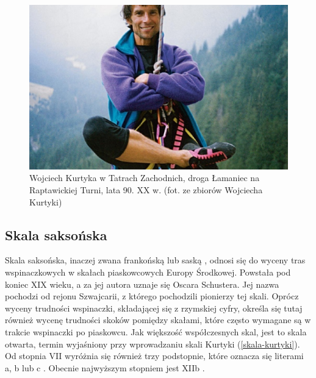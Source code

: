 \documentclass{article}
\begin{document}
\begin{figure}[!htbp]
	\begin{center}
		\includegraphics[width=0.75\linewidth]{images/kurtyka.eps}
	\end{center}
	\caption{Wojciech Kurtyka w Tatrach Zachodnich, droga Łamaniec na Raptawickiej Turni, lata 90. XX w. (fot. ze zbiorów Wojciecha Kurtyki) \cite{tyg-powszechni-kurtyka}}
	\label{kurtyka}
\end{figure}

\subsection{Skala saksońska}
Skala saksońska, inaczej zwana frankońską \cite{skalnik-skale} lub saską \cite{drytooling-skale}, odnosi się do wyceny tras wspinaczkowych w skałach piaskowcowych Europy Środkowej. Powstała pod koniec XIX wieku, a za jej autora uznaje się Oscara Schustera. Jej nazwa pochodzi od rejonu Szwajcarii, z którego pochodzili pionierzy tej skali. Oprócz wyceny trudności wspinaczki, składającej się z rzymskiej cyfry, określa się tutaj również wycenę trudności skoków pomiędzy skałami, które często wymagane są w trakcie wspinaczki po piaskowcu. Jak większość współczesnych skal, jest to skala otwarta, termin wyjaśniony przy wprowadzaniu skali Kurtyki (\ref{skala-kurtyki}). Od stopnia VII wyróżnia się również trzy podstopnie, które oznacza się literami a, b lub c \cite{climb-skale}. Obecnie najwyższym stopniem jest XIIb \cite{skalnik-skale}.
\end{document}
